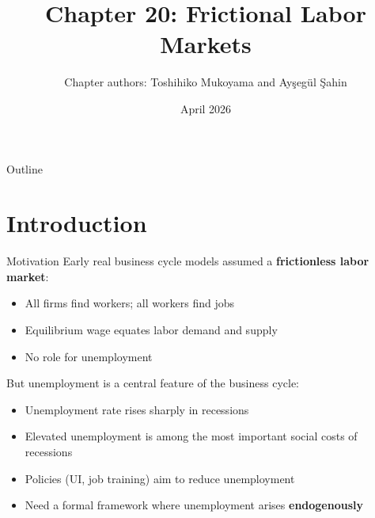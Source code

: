 \documentclass[blue]{beamer}
\title[Ch.\ 20: Frictional Labor Markets]{Chapter 20: Frictional Labor Markets}
\author[Mukoyama \& \c{S}ahin]{Chapter authors: Toshihiko Mukoyama and Ay\c{s}eg\"ul \c{S}ahin}
\date[April 2026]{April 2026}
\begin{document}
  \frame
  {
    \titlepage
  }


\begin{frame}{Outline}
	\tableofcontents
\end{frame}

\section{Introduction}

\begin{frame}{Motivation}
	Early real business cycle models assumed a \textbf{frictionless labor market}:
	\begin{itemize}
		\item All firms find workers; all workers find jobs
		\item Equilibrium wage equates labor demand and supply
		\item No role for unemployment
	\end{itemize}
	
	\bigskip
	But unemployment is a central feature of the business cycle:
	\begin{itemize}
		\item Unemployment rate rises sharply in recessions
		\item Elevated unemployment is among the most important social costs of recessions
		\item Policies (UI, job training) aim to reduce unemployment
		\item Need a formal framework where unemployment arises \textbf{endogenously}
	\end{itemize}
\end{frame}
\end{document}
